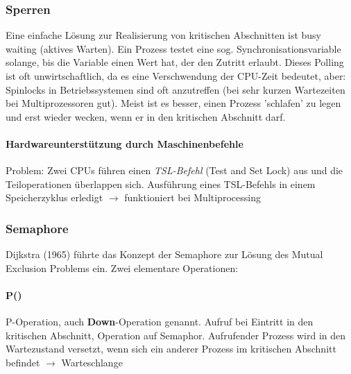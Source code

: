 \documentclass[10pt,a4paper,landscape]{article}
\begin{document}
\begin{multicols*}{3}
	\subsubsection{Sperren}
	Eine einfache Lösung zur Realisierung von kritischen Abschnitten ist busy waiting (aktives Warten). Ein Prozess testet eine sog. Synchronisationsvariable solange, bis die Variable einen Wert hat, der den Zutritt erlaubt. Dieses Polling ist oft unwirtschaftlich, da es eine Verschwendung der CPU-Zeit bedeutet, aber: Spinlocks in Betriebssystemen sind oft anzutreffen (bei sehr kurzen Wartezeiten bei Multiprozessoren gut). Meist ist es besser, einen Prozess 'schlafen' zu legen und erst wieder wecken, wenn er in den kritischen Abschnitt darf.
	\paragraph{Hardwareunterstützung durch Maschinenbefehle} Problem: Zwei CPUs führen einen \textit{TSL-Befehl} (Test and Set Lock) aus und die Teiloperationen überlappen sich. Ausführung eines TSL-Befehls in einem Speicherzyklus erledigt $\rightarrow$ funktioniert bei Multiprocessing
	\subsubsection{Semaphore}
	Dijkstra (1965) führte das Konzept der Semaphore zur Lösung des Mutual Exclusion Problems ein. Zwei elementare Operationen:
	\paragraph{P()} P-Operation, auch \textbf{Down}-Operation genannt. Aufruf bei Eintritt in den kritischen Abschnitt, Operation auf Semaphor. Aufrufender Prozess wird in den Wartezustand versetzt, wenn sich ein anderer Prozess im kritischen Abschnitt befindet $\rightarrow$ Warteschlange

\end{multicols*}
\end{document}
